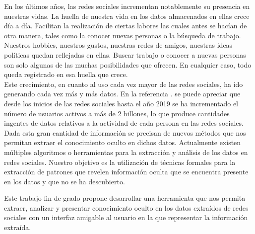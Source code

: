 \documentclass[../../main.tex]{subfiles}
\begin{document}
En los últimos años, las redes sociales incrementan notablemente su presencia en nuestras vidas. La huella de nuestra vida en los datos almacenados en ellas crece día a día. Facilitan la realización de ciertas labores las cuales antes se hacían de otra manera, tales como la conocer nuevas personas o la búsqueda de trabajo. Nuestros hobbies, nuestros gustos, nuestras redes de amigos, nuestras ideas políticas quedan reflejadas en ellas. Buscar trabajo o conocer a nuevas personas son solo algunas de las muchas posibilidades que ofrecen. En cualquier caso, todo queda registrado en esa huella que crece. \\

Este crecimiento, en cuanto al uso cada vez mayor de las redes sociales, ha ido generando cada vez más y más datos. En la referencia \cite{risesn}. se puede apreciar que desde los inicios de las redes sociales hasta el año 2019 se ha incrementado el número de usuarios activos a más de 2 billones, lo que produce cantidades ingentes de datos relativos a la actividad de cada persona en las redes sociales. \\

Dada esta gran cantidad de información se precisan de nuevos métodos que nos permitan extraer el conocimiento oculto en dichos datos. Actualmente existen múltiples algoritmos o herramientas para la extracción y análisis de los datos en redes sociales. Nuestro objetivo es la utilización de técnicas formales para la extracción de patrones que revelen información oculta que se encuentra presente en los datos y que no se ha descubierto. \\ \newline\newline

Este trabajo fin de grado propone desarrollar una herramienta que nos permita extraer, analizar y presentar conocimiento oculto en los datos extraídos de redes sociales con  un interfaz amigable al usuario en la que representar la información extraída. 
\end{document}

